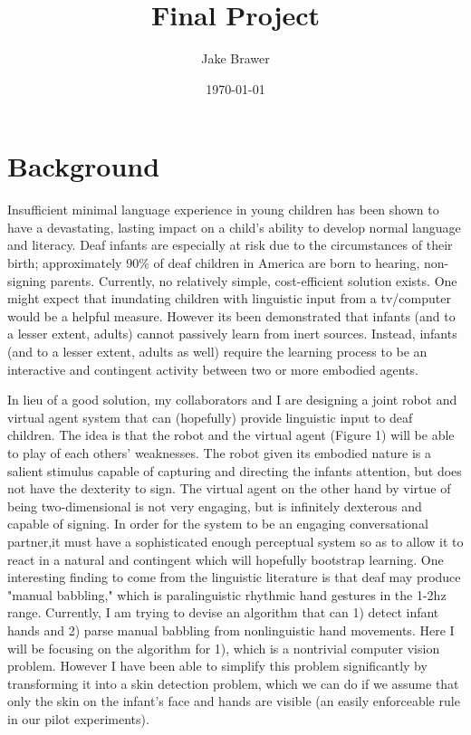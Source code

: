 \documentclass[11pt]{article}
\author{Jake Brawer}
\date{\today}
\title{Final Project}
\begin{document}
\maketitle

\section{Background}
\label{sec:orgb516565}

Insufficient minimal language experience in young children has been shown to have a devastating, lasting impact on a child's ability to develop normal language and literacy. Deaf infants are especially at risk due to the circumstances of their birth; approximately 90\% of deaf children in America are born to hearing, non-signing parents. Currently, no relatively simple, cost-efficient solution exists. One might expect that inundating children with linguistic input from a tv/computer would be a helpful measure. However its been demonstrated that infants (and to a lesser extent, adults) cannot passively learn from inert sources. Instead, infants (and to a lesser extent, adults as well) require  the learning process to be an interactive and contingent activity between two or more embodied agents. 

In lieu of a good solution, my collaborators and I are designing a joint robot and virtual agent system that can (hopefully) provide linguistic input to deaf children. The idea is that the robot and the virtual agent (Figure 1) will be able to play of each others' weaknesses. The robot given its embodied nature is a salient stimulus capable of capturing and directing the infants attention, but does not have the dexterity to sign. The virtual agent on the other hand by virtue of being two-dimensional is not very engaging, but is infinitely dexterous and capable of signing. In order for the system to be an engaging conversational partner,it must have a sophisticated enough perceptual system so as to allow it to react in a natural and contingent which will hopefully bootstrap learning. One interesting finding to come from the linguistic literature is that deaf may produce "manual babbling," which is paralinguistic rhythmic hand gestures in the 1-2hz range. Currently, I am trying to devise an algorithm that can 1) detect infant hands and 2) parse manual babbling from nonlinguistic hand movements. Here I will be focusing on the algorithm for 1), which is a nontrivial computer vision problem. However I have been able to simplify this problem significantly by transforming it into a skin detection problem, which we can do if we assume that only the skin on the infant's face and hands are visible (an easily enforceable rule in our pilot experiments). 
\end{document}
